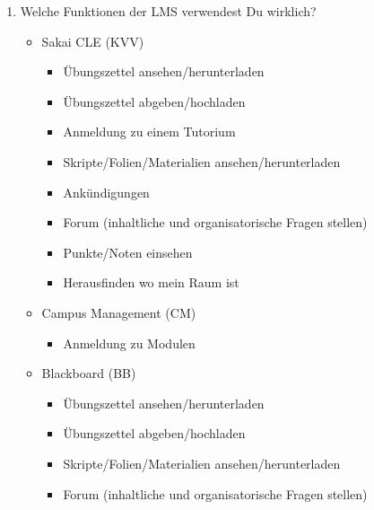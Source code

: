 \documentclass{article}
\begin{document}
\begin{enumerate}
\item Welche Funktionen der LMS verwendest Du wirklich?
\begin{itemize}
\item Sakai CLE (KVV)
\begin{itemize}
\item Übungszettel ansehen/herunterladen
\item Übungszettel abgeben/hochladen
\item Anmeldung zu einem Tutorium
\item Skripte/Folien/Materialien ansehen/herunterladen
\item Ankündigungen
\item Forum (inhaltliche und organisatorische Fragen stellen)
\item Punkte/Noten einsehen
\item Herausfinden wo mein Raum ist
\end{itemize}
\item Campus Management (CM)
\begin{itemize}
\item Anmeldung zu Modulen
\end{itemize}
\item Blackboard (BB)
\begin{itemize}
\item Übungszettel ansehen/herunterladen
\item Übungszettel abgeben/hochladen
\item Skripte/Folien/Materialien ansehen/herunterladen
\item Forum (inhaltliche und organisatorische Fragen stellen)
\end{itemize}
\end{itemize}


\end{enumerate}
\end{document}
